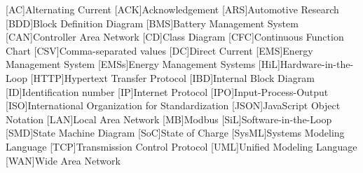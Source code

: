 % 
\begin{acronym}[STATCOM]    %
%
[AC]{Alternating Current}
%
[ACK]{Acknowledgement}
%
[ARS]{Automotive Research}
%
[BDD]{Block Definition Diagram}
%
[BMS]{Battery Management System}
%
[CAN]{Controller Area Network}
%
[CD]{Class Diagram}
%
[CFC]{Continuous Function Chart}
%
[CSV]{Comma-separated values}
%
[DC]{Direct Current}
%
[EMS]{Energy Management System}
[EMSs]{Energy Management Systems}
%
[HiL]{Hardware-in-the-Loop}
%
[HTTP]{Hypertext Transfer Protocol}
%
[IBD]{Internal Block Diagram}
%
[ID]{Identification number}
%
[IP]{Internet Protocol}
%
[IPO]{Input-Process-Output}
%
[ISO]{International Organization for Standardization}
%
[JSON]{JavaScript Object Notation}
%
[LAN]{Local Area Network}
%
[MB]{Modbus}
%
[SiL]{Software-in-the-Loop}
%
[SMD]{State Machine Diagram}
%
[SoC]{State of Charge}
%
[SysML]{Systems Modeling Language}
%
[TCP]{Transmission Control Protocol}
%
[UML]{Unified Modeling Language}
%
[WAN]{Wide Area Network}
%
\end{acronym}
%